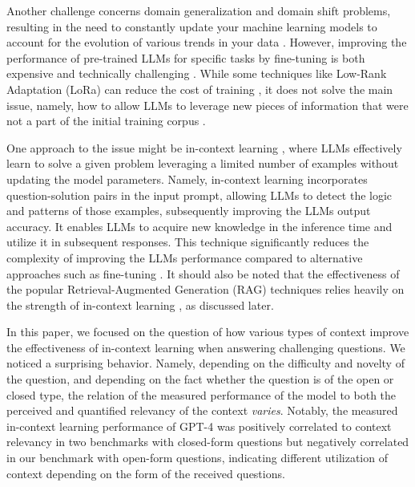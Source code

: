 \documentclass{article}
\begin{document}
    Another challenge concerns domain generalization and domain shift problems, resulting in the need to constantly update your machine learning models to account for the evolution of various trends in your data \citep{Zhou2022}. However, improving the performance of pre-trained LLMs for specific tasks by fine-tuning is both expensive \citep{Bender2021, Luccioni2023} and technically challenging \citep{pmlr-v202-kandpal23a, Gaspers2022}. While some techniques like Low-Rank Adaptation (LoRa) can reduce the cost of training \citep{Hu2011}, it does not solve the main issue, namely, how to allow LLMs to leverage new pieces of information that were not a part of the initial training corpus \citep{Liu2017}.

    One approach to the issue might be in-context learning \citep{brown2020language}, where LLMs effectively learn to solve a given problem leveraging a limited number of examples without updating the model parameters. Namely, in-context learning incorporates question-solution pairs in the input prompt, allowing LLMs to detect the logic and patterns of those examples, subsequently improving the LLMs output accuracy. It enables LLMs to acquire new knowledge in the inference time and utilize it in subsequent responses. This technique significantly reduces the complexity of improving the LLMs performance compared to alternative approaches such as fine-tuning \citep{min2022rethinking}. 
    It should also be noted that the effectiveness of the popular Retrieval-Augmented Generation (RAG) techniques relies heavily on the strength of in-context learning    \citep{gao2024retrievalaugmentedgenerationlargelanguage}, as discussed later.

    In this paper, we focused on the question of how various types of context improve the effectiveness of in-context learning when answering challenging questions. We noticed a surprising behavior. Namely, depending on the difficulty and novelty of the question, and depending on the fact whether the question is of the open or closed type, the relation of the measured performance of the model to both the perceived and quantified relevancy of the context \emph{varies}. Notably, the measured in-context learning performance of GPT-4 was positively correlated to context relevancy in two benchmarks with closed-form questions but negatively correlated in our benchmark with open-form questions, indicating different utilization of context depending on the form of the received questions.
\end{document}
